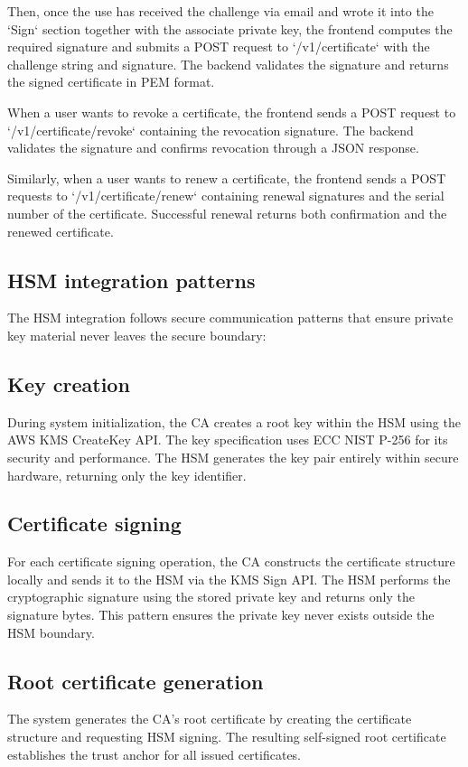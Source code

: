 Then, once the use has received the challenge via email and wrote it into the `Sign` section
together with the associate private key, the frontend computes the required signature and submits 
a POST request to `/v1/certificate` with the challenge string and signature. 
The backend validates the signature and returns the signed certificate in PEM format.

When a user wants to revoke a certificate, the frontend sends a POST request to 
`/v1/certificate/revoke` containing the revocation signature. The backend validates 
the signature and confirms revocation through a JSON response.

Similarly, when a user wants to renew a certificate, the frontend sends a POST 
requests to `/v1/certificate/renew` containing renewal signatures and the serial number of the 
certificate. Successful renewal returns both confirmation and the renewed certificate.

\subsection{HSM integration patterns}

The HSM integration follows secure communication patterns 
that ensure private key material never leaves the secure boundary:

\subsection{Key creation}
During system initialization, the CA creates a root key 
within the HSM using the AWS KMS CreateKey API. The key specification uses 
ECC NIST P-256 for its security and performance. The HSM generates the key 
pair entirely within secure hardware, returning only the key identifier.

\subsection{Certificate signing}
For each certificate signing operation, the CA 
constructs the certificate structure locally and sends it to the HSM via the 
KMS Sign API. The HSM performs the cryptographic signature using the stored 
private key and returns only the signature bytes. This pattern ensures the 
private key never exists outside the HSM boundary.

\subsection{Root certificate generation}
The system generates the CA's root certificate 
by creating the certificate structure and requesting HSM signing. The resulting 
self-signed root certificate establishes the trust anchor for all issued certificates.

